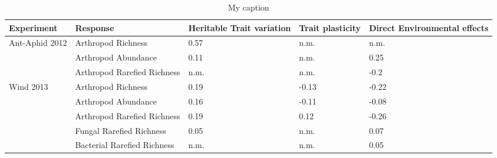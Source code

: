 \begin{table}[]
\centering
\caption{My caption}
\label{my}
\begin{tabular}{@{}lllll@{}}
\toprule
Experiment                      & Response                    & Heritable Trait variation & Trait plasticity & Direct Environmental effects \\ \midrule
\multirow{3}{*}{Ant-Aphid 2012} & Arthropod Richness          & 0.57                      & n.m.             & n.m.                         \\
                                & Arthropod Abundance         & 0.11                      & n.m.             & 0.25                         \\
                                & Arthropod Rarefied Richness & n.m.                      & n.m.             & -0.2                         \\
\multirow{5}{*}{Wind 2013}      & Arthropod Richness          & 0.19                      & -0.13            & -0.22                        \\
                                & Arthropod Abundance         & 0.16                      & -0.11            & -0.08                        \\
                                & Arthropod Rarefied Richness & 0.19                      & 0.12             & -0.26                        \\
                                & Fungal Rarefied Richness    & 0.05                      & n.m.             & 0.07                         \\
                                & Bacterial Rarefied Richness & n.m.                      & n.m.             & 0.05                         \\ \cmidrule(l){2-5} 
\end{tabular}
\end{table}